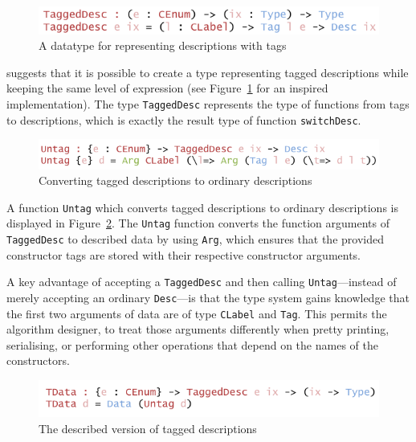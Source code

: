 \documentclass{ituthesis}
\newcommand{\ttconstructor}[1]{\textcolor{constructor-color}{\texttt{#1}}}
\newcommand{\tttype}[1]{\textcolor{type-color}{\texttt{#1}}}
\newcommand{\ttdec}[1]{\textcolor{declared-var-color}{\texttt{#1}}}
\theoremstyle{break}
\begin{document}
\begin{figure}[ht]
\begin{center}
    \includegraphics[scale=0.5]{Figures/TaggingDescriptions.png}
\end{center}
\caption{A datatype for representing descriptions with tags}
\label{fig:tagdesc}
\end{figure}

\textcite{Dagand2013acosmology} suggests that it is possible to create a type representing tagged descriptions while keeping
the same level of expression (see Figure~\ref{fig:tagdesc} for an inspired implementation).
The type \ttdec{TaggedDesc} represents the type of functions from tags to descriptions, which is exactly the result type of function \ttdec{switchDesc}.

\begin{figure}[ht]
\begin{center}
    \includegraphics[scale=0.5]{Figures/DetaggingDescriptions.png}
\end{center}
\caption{Converting tagged descriptions to ordinary descriptions}
\label{fig:untagdesc}
\end{figure}

A function \ttdec{Untag} which converts tagged descriptions to ordinary descriptions is displayed in Figure~\ref{fig:untagdesc}.
The \ttdec{Untag} function converts the function arguments of \tttype{TaggedDesc} to described data by using \ttconstructor{Arg}, which ensures
that the provided constructor tags are stored with their respective constructor arguments.

A key advantage of accepting a \ttdec{TaggedDesc} and then calling \ttdec{Untag}---instead of merely accepting an ordinary \tttype{Desc}---is that the type system
gains knowledge that the first two arguments of data are of type \ttdec{CLabel} and \tttype{Tag}.
This permits the algorithm designer, to treat those arguments differently when pretty printing, serialising, or performing other operations that depend on the names of the constructors.

\begin{figure}[ht]
\begin{center}
    \includegraphics[scale=0.5]{Figures/TaggedDescriptionData.png}
\end{center}
\caption{The described version of tagged descriptions}
\label{fig:tagdata}
\end{figure}
\end{document}
